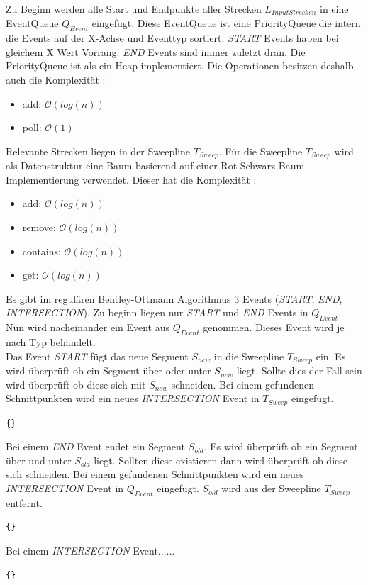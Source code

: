 \documentclass[conference]{IEEEtran}
\begin{document}
	Zu Beginn werden alle Start und Endpunkte aller Strecken $L_{InputStrecken}$ in eine EventQueue $Q_{Event}$ eingefügt. Diese EventQueue ist eine PriorityQueue die intern die Events auf der X-Achse und Eventtyp sortiert. \textit{START} Events haben bei gleichem X Wert Vorrang. \textit{END} Events sind immer zuletzt dran. Die PriorityQueue ist als ein Heap implementiert. Die Operationen besitzen deshalb auch die Komplexität \cite{b2}:
	\begin{itemize}
		\item add: $\mathcal{O}(log(n))$
		\item poll: $\mathcal{O}(1)$
	\end{itemize}
	Relevante Strecken liegen in der Sweepline $T_{Sweep}$.
	Für die Sweepline $T_{Sweep}$ wird als Datenstruktur eine Baum basierend auf einer Rot-Schwarz-Baum Implementierung verwendet. Dieser hat die Komplexität \cite{b1}:
	\begin{itemize}
		\item add: $\mathcal{O}(log(n))$
		\item remove: $\mathcal{O}(log(n))$
		\item contains: $\mathcal{O}(log(n))$
		\item get: $\mathcal{O}(log(n))$
	\end{itemize}
	Es gibt im regulären Bentley-Ottmann Algorithmus 3 Events (\textit{START}, \textit{END}, \textit{INTERSECTION}).
	Zu beginn liegen nur \textit{START} und \textit{END} Events in $Q_{Event}$.\\
	Nun wird nacheinander ein Event aus $Q_{Event}$ genommen. Dieses Event wird je nach Typ behandelt.\\
	Das Event \textit{START} fügt das neue Segment $S_{new}$ in die Sweepline $T_{Sweep}$ ein.
	Es wird überprüft ob ein Segment über oder unter $S_{new}$ liegt. Sollte dies der Fall sein wird überprüft ob diese sich mit $S_{new}$ schneiden. Bei einem gefundenen Schnittpunkten wird ein neues \textit{INTERSECTION} Event in $T_{Sweep}$ eingefügt.
	\begin{lstlisting}[basicstyle=\tiny]
	{}
	\end{lstlisting}
	Bei einem \textit{END} Event endet ein Segment $S_{old}$. Es wird überprüft ob ein Segment über und unter $S_{old}$ liegt. Sollten diese existieren dann wird überprüft ob diese sich schneiden. Bei einem gefundenen Schnittpunkten wird ein neues \textit{INTERSECTION} Event in $Q_{Event}$ eingefügt. $S_{old}$ wird aus der Sweepline $T_{Sweep}$ entfernt.
	\begin{lstlisting}[basicstyle=\tiny]
		{}
	\end{lstlisting}
	Bei einem \textit{INTERSECTION} Event......
	\begin{lstlisting}[basicstyle=\tiny]
		{}
	\end{lstlisting}
\end{document}
